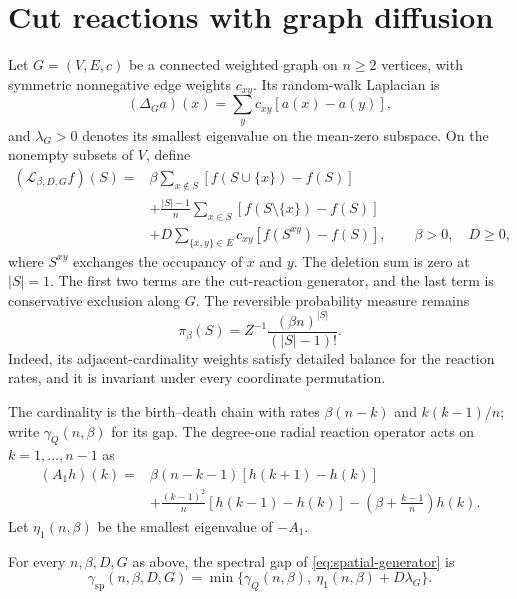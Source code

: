 \section{Cut reactions with graph diffusion}
\label{sec:spatial-diffusion}

Let $G=(V,E,c)$ be a connected weighted graph on $n\geq2$ vertices,
with symmetric nonnegative edge weights $c_{xy}$.  Its random-walk
Laplacian is
\[
 (\Delta_G a)(x)=\sum_yc_{xy}[a(x)-a(y)],
\]
and $\lambda_G>0$ denotes its smallest eigenvalue on the mean-zero
subspace.  On the nonempty subsets of $V$, define
\begin{equation}\label{eq:spatial-generator}
 \begin{split}
 (\mathcal L_{\beta,D,G}f)(S)
 ={}&\beta\sum_{x\notin S}[f(S\cup\{x\})-f(S)]\\
 &+\frac{|S|-1}{n}\sum_{x\in S}[f(S\setminus\{x\})-f(S)]\\
 &+D\sum_{\{x,y\}\in E}c_{xy}[f(S^{xy})-f(S)],
 \qquad \beta>0,\quad D\geq0,
 \end{split}
\end{equation}
where $S^{xy}$ exchanges the occupancy of $x$ and $y$.  The deletion
sum is zero at $|S|=1$.  The first two terms are the cut-reaction
generator, and the last term is conservative exclusion along $G$.
The reversible probability measure remains
\begin{equation}\label{eq:spatial-reversible-law}
 \pi_\beta(S)=Z^{-1}\frac{(\beta n)^{|S|}}{(|S|-1)!}.
\end{equation}
Indeed, its adjacent-cardinality weights satisfy detailed balance for
the reaction rates, and it is invariant under every coordinate
permutation.

The cardinality is the birth--death chain with rates
$\beta(n-k)$ and $k(k-1)/n$; write $\gamma_Q(n,\beta)$ for its gap.
The degree-one radial reaction operator acts on $k=1,\ldots,n-1$ as
\begin{equation}\label{eq:spatial-degree-one}
 \begin{split}
 (A_1h)(k)
 ={}&\beta(n-k-1)[h(k+1)-h(k)]\\
 &+\frac{(k-1)^2}{n}[h(k-1)-h(k)]
   -\left(\beta+\frac{k-1}{n}\right)h(k).
 \end{split}
\end{equation}
Let $\eta_1(n,\beta)$ be the smallest eigenvalue of $-A_1$.

\begin{theorem}
\label{thm:spatial-exact-gap}\label{thm:spatial-gap}
For every $n,\beta,D,G$ as above, the spectral gap of
\eqref{eq:spatial-generator} is
\begin{equation}\label{eq:spatial-exact-gap}
 \gamma_{\mathrm{sp}}(n,\beta,D,G)
 =\min\{\gamma_Q(n,\beta),\ \eta_1(n,\beta)+D\lambda_G\}.
\end{equation}
\end{theorem}

